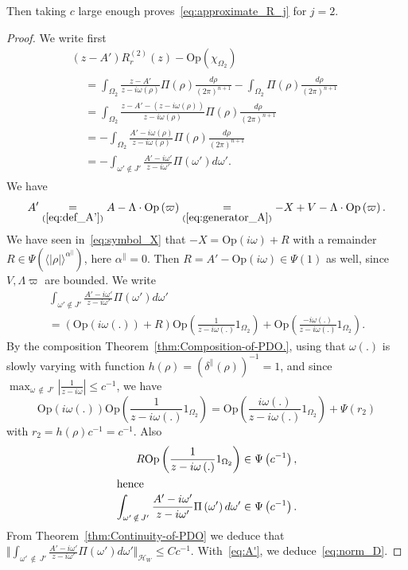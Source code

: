 \documentclass[10pt]{amsart}
\theoremstyle{definition}\newtheorem{defi}[theo]{Definition}\newtheorem{rema}[theo]{Remark}\newtheorem{exam}[theo]{Example}\newtheorem{exem}[theo]{Example}\newtheorem{nota}[theo]{Notation}
\newcommand*\eq[1]{\underset{(#1)}{=}}
\newcommand{\clH}{\mathcal{H}}
\newcommand{\Opp}{\mathrm{Op}}
\begin{document}
Then taking $c$ large enough proves~\eqref{eq:approximate_R_j} for $j=2$.
\begin{proof}
We write first
\begin{multline}\label{eq:A'}
\left(z-A'\right)R_{r}^{\left(2\right)}\left(z\right)-\Opp \left(\chi_{\Omega_{2}}\right)\\
\begin{aligned}
& =\int_{\Omega_{2}}\frac{z-A'}{z-i\omega\left(\rho\right)}\Pi\left(\rho\right)\frac{d\rho}{\left(2\pi\right)^{n+1}}-\int_{\Omega_{2}}\Pi\left(\rho\right)\frac{d\rho}{\left(2\pi\right)^{n+1}}\\
& =\int_{\Omega_{2}}\frac{z-A'-\left(z-i\omega\left(\rho\right)\right)}{z-i\omega\left(\rho\right)}\Pi\left(\rho\right)\frac{d\rho}{\left(2\pi\right)^{n+1}}\\
& =-\int_{\Omega_{2}}\frac{A'-i\omega\left(\rho\right)}{z-i\omega\left(\rho\right)}\Pi\left(\rho\right)\frac{d\rho}{\left(2\pi\right)^{n+1}}\\
& =-\int_{\omega'\notin J'}\frac{A'-i\omega'}{z-i\omega'}\Pi\left(\omega'\right)d\omega'.
\end{aligned}
\end{multline}
We have
\[
A'\eq{\ref{eq:def_A'}}A-\Lambda\cdot\Opp \left(\varpi\right)\eq{\ref{eq:generator_A}}-X+V-\Lambda\cdot\Opp \left(\varpi\right).
\]
We have seen in~\eqref{eq:symbol_X} that $-X=\Opp (i\omega)+R$ with a remainder $R\in\Psi(\langle|\rho|\rangle^{\alpha^{\parallel}})$, here $\alpha^{\parallel}=0$. Then $R=A'-\Opp (i\omega)\in\Psi(1)$ as well, since $V,\Lambda\varpi$ are bounded. We write
\begin{multline*}
\int_{\omega'\notin J'}\frac{A'-i\omega'}{z-i\omega'}\Pi\left(\omega'\right)d\omega'\\
=\left(\Opp \left(i\omega\left(.\right)\right)+R\right)\Opp \left(\frac{1}{z-i\omega\left(.\right)}\mathrm{1}_{\Omega_{2}}\right)+\Opp \left(\frac{-i\omega\left(.\right)}{z-i\omega\left(.\right)}\mathrm{1}_{\Omega_{2}}\right).
\end{multline*}
By the composition Theorem~\ref{thm:Composition-of-PDO.}, using that $\omega(.)$ is slowly varying with function $h(\rho)=(\delta^{\parallel}(\rho))^{-1}=1$, and since $\max_{\omega\,\notin\,J'}|\frac{1}{z-i\omega}|\leq c^{-1}$, we have
\[
\Opp \left(i\omega\left(.\right)\right)\Opp \left(\frac{1}{z-i\omega\left(.\right)}\mathrm{1}_{\Omega_{2}}\right)=\Opp \left(\frac{i\omega\left(.\right)}{z-i\omega\left(.\right)}\mathrm{1}_{\Omega_{2}}\right)+\Psi\left(r_{2}\right)
\]
with $r_{2}=h(\rho)c^{-1}=c^{-1}$. Also
\begin{align*}
R\Opp \left(\frac{1}{z-i\omega\left(.\right)}\mathrm{1}_{\Omega_{2}}\right) &\in\Psi\left(c^{-1}\right),
\\
\intertext{hence}
\int_{\omega'\,\notin\,J'}\frac{A'-i\omega'}{z-i\omega'}\Pi\left(\omega'\right)d\omega' &\in\Psi\left(c^{-1}\right).
\end{align*}
From Theorem~\ref{thm:Continuity-of-PDO} we deduce that $\Vert \int_{\omega'\,\notin\,J'}\frac{A'-i\omega'}{z-i\omega'}\Pi(\omega')d\omega'\Vert _{\clH _{W}}\leq Cc^{-1}$. With~\eqref{eq:A'}, we deduce~\eqref{eq:norm_D}.
\end{proof}
\end{document}
